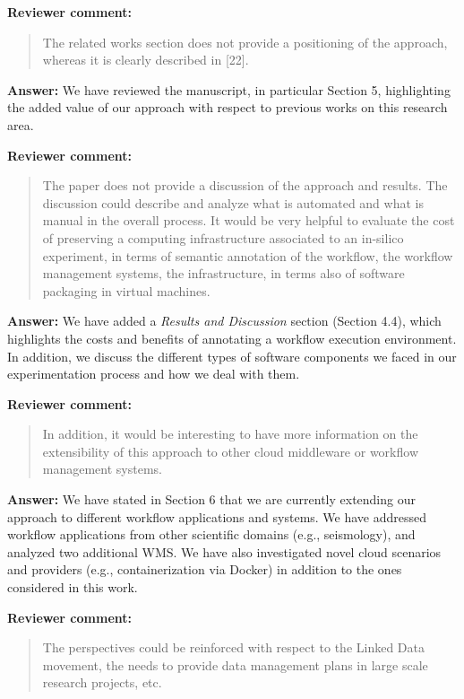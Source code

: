 \documentclass{letter}
\newenvironment{review}%
{\textbf{Reviewer comment:}\begin{quote}}%
{\end{quote}}%
\newcommand{\answer}[1]{%
      \textbf{Answer:} #1}
\begin{document}
\begin{letter}{}
\begin{review}
The related works section does not provide a positioning of the approach, whereas it is clearly described in [22].
\end{review}

\answer{We have reviewed the  manuscript, in particular Section 5, highlighting the added value of our approach with respect to previous works on this research area.}


\begin{review}
The paper does not provide a discussion of the approach and results. The discussion could describe and analyze what is automated and what is manual in the overall process. It would be very helpful to evaluate the cost of preserving a computing infrastructure associated to an in-silico experiment, in terms of semantic annotation of the workflow, the workflow management systems, the infrastructure, in terms also of software packaging in virtual machines.
\end{review}

\answer{We have added a \emph{Results and Discussion} section (Section 4.4), which highlights the costs and benefits of annotating a workflow execution environment. In addition, we discuss the different types of software components we faced in our experimentation process and how we deal with them.}


\begin{review}
In addition, it would be interesting to have more information on the extensibility of this approach to other cloud middleware or workflow management systems.
\end{review}

\answer{We have stated in Section 6 that we are currently extending our approach to different workflow applications and systems. We have addressed workflow applications from other scientific domains (e.g., seismology), and analyzed two additional WMS. We have also investigated novel cloud scenarios and providers (e.g., containerization via Docker) in addition to the ones considered in this work.}


\begin{review}
The perspectives could be reinforced with respect to the Linked Data movement, the needs to provide data management plans in large scale research projects, etc.
\end{review}


\end{letter}
\end{document}
